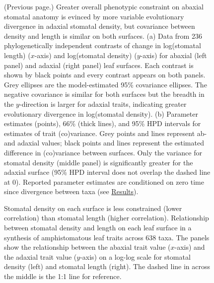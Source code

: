 \documentclass[
  12pt,
]{article}
\begin{document}
\begin{figure}[ht]
\caption{(Previous page.) Greater overall phenotypic constraint on abaxial stomatal anatomy is evinced by more variable evolutionary divergence in adaxial stomatal density, but covariance between density and length is similar on both surfaces. (a) Data from 236 phylogenetically independent contrasts of change in log(stomatal length) ($x$-axis) and log(stomatal density) ($y$-axis) for abaxial (left panel) and adaxial (right panel) leaf surfaces. Each contrast is shown by black points and every contrast appears on both panels. Grey ellipses are the model-estimated 95\% covariance ellipses. The negative covariance is similar for both surfaces but the breadth in the $y$-direction is larger for adaxial traits, indicating greater evolutionary divergence in log(stomatal density). (b) Parameter estimates (points), 66\% (thick lines), and 95\% HPD intervals for estimates of trait (co)variance. Grey points and lines represent ab- and adaxial values; black points and lines represent the estimated difference in (co)variance between surfaces. Only the variance for stomatal density (middle panel) is significantly greater for the adaxial surface (95\% HPD interval does not overlap the dashed line at 0). Reported parameter estimates are conditioned on zero time since divergence between taxa (see \protect\hyperlink{results}{Results}).}
  \label{fig:h1}
\end{figure}

\begin{figure}[ht]
\caption{Stomatal density on each surface is less constrained (lower correlation) than stomatal length (higher correlation). Relationship between stomatal density and length on each leaf surface in a synthesis of amphistomatous leaf traits across 638 taxa. The panels show the relationship between the abaxial trait value ($x$-axis) and the adaxial trait value ($y$-axis) on a log-log scale for stomatal density (left) and stomatal length (right). The dashed line in across the middle is the 1:1 line for reference.}
\label{fig:h2_raw}
\end{figure}
\end{document}
